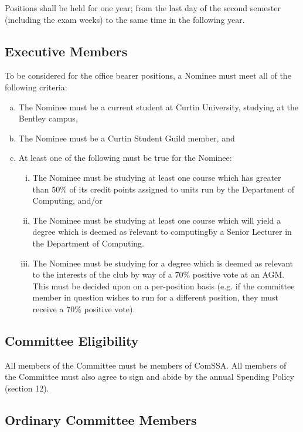 \documentclass[a4paper,12pt]{article}
\begin{document}
Positions shall be held for one year; from the last day of the second semester (including the exam weeks) to the same time in the following year.

\subsection{Executive Members}

To be considered for the office bearer positions, a Nominee must meet all of the following criteria:

\begin{enumerate}[a)]
	\item The Nominee must be a current student at Curtin University, studying at the Bentley campus,
	\item The Nominee must be a Curtin Student Guild member, and
	\item At least one of the following must be true for the Nominee:
	\begin{enumerate}[i)]
		\item The Nominee must be studying at least one course which has greater than 50\% of its credit points assigned to units run by the Department of Computing, and/or
		\item The Nominee must be studying at least one course which will yield a degree which is deemed as \"relevant to computing\" by a Senior Lecturer in the Department of Computing.
		\item The Nominee must be studying for a degree which is deemed as relevant to the interests of the club by way of a 70\% positive vote at an AGM. This must be decided upon on a per-position basis (e.g. if the committee member in question wishes to run for a different position, they must receive a 70\% positive vote).
	\end{enumerate}
\end{enumerate}

\subsection{Committee Eligibility}

All members of the Committee must be members of ComSSA. All members of the Committee must also agree to sign and abide by the annual Spending Policy (section 12).

\subsection{Ordinary Committee Members}
\end{document}
